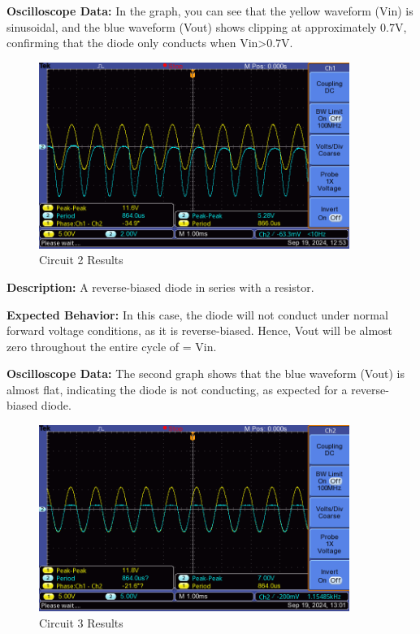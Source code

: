 \documentclass{article}
\begin{document}
\textbf{Oscilloscope Data:} In the graph, you can see that the yellow waveform 
(Vin) is sinusoidal, and the blue waveform (Vout) shows clipping at 
approximately 0.7V, confirming that the diode only conducts when Vin>0.7V.

\begin{figure}[H]
    \centering
    \includegraphics[width=0.9\textwidth]{./img/Lab4_2_2.png}
    \caption{Circuit 2 Results}
    \label{fig:graph4}
\end{figure}

\textbf{Description:} A reverse-biased diode in series with a resistor.

\textbf{Expected Behavior:} In this case, the diode will not conduct under normal forward voltage conditions, as it is reverse-biased. Hence, 
Vout will be almost zero throughout the entire cycle of = Vin.

\textbf{Oscilloscope Data:} The second graph shows that the blue waveform (Vout) is almost flat, indicating the diode is not conducting, as expected for a reverse-biased diode.

\begin{figure}[H]
    \centering
    \includegraphics[width=0.9\textwidth]{./img/Lab4_2_3.png}
    \caption{Circuit 3 Results}
    \label{fig:graph5}
\end{figure}
\end{document}
